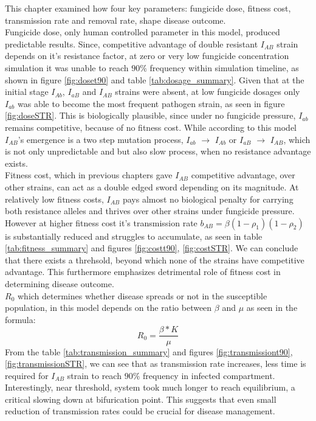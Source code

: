 \documentclass{report}
\begin{document}
This chapter examined how four key parameters: fungicide dose, fitness cost, transmission rate and removal rate, shape disease outcome. \\
Fungicide dose, only human controlled parameter in this model, produced predictable results. Since, competitive advantage of  double resistant $I_{AB}$ strain depends on it's resistance factor, at zero or very low fungicide concentration simulation it was unable to reach $90\%$ frequency within simulation timeline, as shown in figure \ref{fig:doset90} and table \ref{tab:dosage_summary}. Given that at the initial stage $I_{Ab}$, $I_{aB}$ and $I_{AB}$ strains were absent, at low fungicide dosages only $I_{ab}$ was able to become the most frequent pathogen strain, as seen in figure \ref{fig:doseSTR}.
This is biologically plausible, since under no fungicide pressure, $I_{ab}$ remains competitive, because of no fitness cost. While according to this model $I_{AB}$'s emergence is a two step mutation process, $I_{ab}$ $\rightarrow$ $I_{Ab}$ or $I_{aB}$ $\rightarrow$ $I_{AB}$, which is not only unpredictable and but also slow process, when no resistance advantage exists. \\
Fitness cost, which in previous chapters gave $I_{AB}$ competitive advantage, over other strains, can act as a double edged sword depending on its magnitude. At relatively low fitness costs, $I_{AB}$ pays almost no biological penalty for carrying both resistance alleles and thrives over other strains under fungicide pressure. However at higher fitness cost it's transmission rate $b_{AB}=\beta(1-\rho_1)(1-\rho_2)$ is substantially reduced and struggles to accumulate, as seen in table \ref{tab:fitness_summary} and figures \ref{fig:costt90}, \ref{fig:costSTR}. We can conclude that there exists a threhsold, beyond which none of the strains have competitive advantage. 
This furthermore emphasizes detrimental role of fitness cost in determining disease outcome.\\
$R_{0}$ which determines whether disease spreads or not in the susceptible population, in this model depends on the ratio between $\beta$ and $\mu$ as seen in the formula: \[R_{0}=\frac{\beta * K}{\mu}\] From the table \ref{tab:transmission_summary} and figures \ref{fig:transmissiont90}, \ref{fig:transmissionSTR}, we can see that as transmission rate increases, less time is required for $I_{AB}$ strain to reach $90\%$ frequency in infected compartment. Interestingly, near threshold, system took much longer to reach equilibrium, a critical slowing down at bifurication point. This suggests that even small reduction of transmission rates could be crucial for disease management.\\
\end{document}
